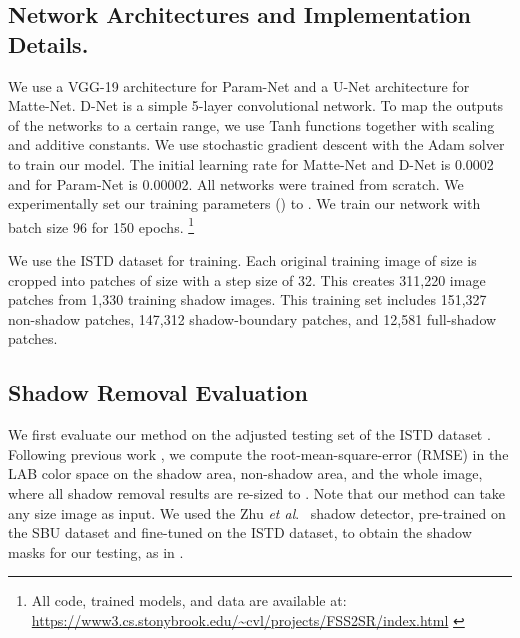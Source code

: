 \documentclass[runningheads]{llncs}
\newcommand{\pink}[1]{\textcolor{pink}{#1}}
\def\etal{\emph{et al}.}
\begin{document}
\subsection{Network Architectures and Implementation Details.}
We use a VGG-19 architecture for Param-Net and a U-Net architecture for Matte-Net. D-Net is a simple 5-layer convolutional network. To map the outputs of the networks to a certain range, we use Tanh functions together with scaling and additive constants. We use stochastic gradient descent
with the Adam solver \cite{Adam} to train our model. The initial learning rate for Matte-Net and D-Net is 0.0002 and for Param-Net is 0.00002. All networks were trained from scratch. We experimentally set our training parameters () to . We train our network with batch size 96 for 150 epochs. \footnote{All  code, trained models, and data are available at: \pink{\url{ https://www3.cs.stonybrook.edu/~cvl/projects/FSS2SR/index.html} }}

We use the ISTD dataset \cite{Wang_2018_CVPR} for training. Each original training image of size  is cropped into patches of size  with a step size of 32. This creates 311,220 image patches from 1,330 training shadow images. This training set includes 151,327 non-shadow patches, 147,312 shadow-boundary patches, and 12,581 full-shadow patches. 

\subsection{Shadow Removal Evaluation}



We first evaluate our method on the adjusted testing set of the ISTD dataset \cite{Wang_2018_CVPR,Le-etal-ICCV19}. Following previous work \cite{Wang_2018_CVPR,guoPami,Qu_2017_CVPR,Le-etal-ICCV19}, we compute the root-mean-square-error (RMSE) in the LAB color space on the shadow area, non-shadow area, and the whole image, where all shadow removal results are re-sized to . Note that our method can  take any size image as input. We used the Zhu \etal~\cite{zhu18b} shadow detector, pre-trained on the SBU dataset and fine-tuned on the ISTD dataset, to obtain the shadow masks for our testing, as in \cite{Le-etal-ICCV19}. 
\end{document}
